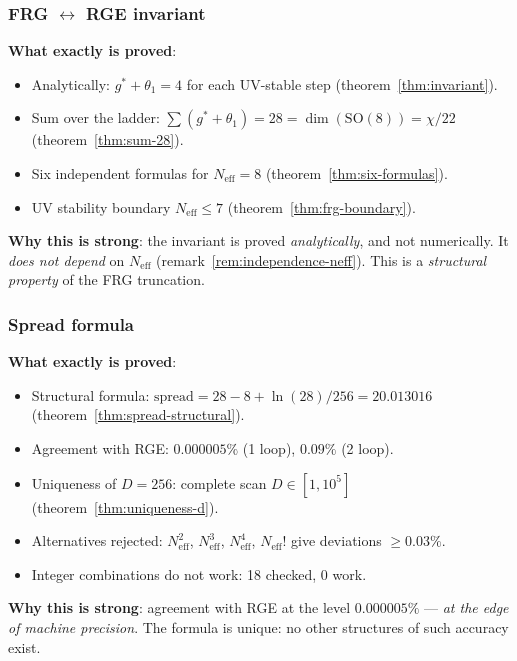 \documentclass[11pt,a4paper]{article}
\newcommand{\SO}{\ensuremath{\mathrm{SO}}}
\theoremstyle{definition}
\begin{document}
\subsubsection{FRG \texorpdfstring{$\leftrightarrow$}{} RGE invariant}

\textbf{What exactly is proved}:
\begin{itemize}
    \item Analytically: $g^* + \theta_1 = 4$ for each
          UV-stable step (theorem~\ref{thm:invariant}).
    \item Sum over the ladder:
          $\sum(g^* + \theta_1) = 28 = \dim(\SO(8)) = \chi/22$
          (theorem~\ref{thm:sum-28}).
    \item Six independent formulas for $N_{\text{eff}} = 8$
          (theorem~\ref{thm:six-formulas}).
    \item UV stability boundary $N_{\text{eff}} \le 7$
          (theorem~\ref{thm:frg-boundary}).
\end{itemize}

\medskip\noindent
\textbf{Why this is strong}: the invariant is proved
\emph{analytically}, and not numerically. It \emph{does not depend}
on $N_{\text{eff}}$ (remark~\ref{rem:independence-neff}).
This is a \emph{structural property} of the FRG truncation.

\subsubsection{Spread formula}

\textbf{What exactly is proved}:
\begin{itemize}
    \item Structural formula:
          $\text{spread} = 28 - 8 + \ln(28)/256 = 20.013016$
          (theorem~\ref{thm:spread-structural}).
    \item Agreement with RGE: $0.000005\%$ (1 loop),
          $0.09\%$ (2 loop).
    \item Uniqueness of $D = 256$: complete scan
          $D \in [1, 10^5]$ (theorem~\ref{thm:uniqueness-d}).
    \item Alternatives rejected: $N_{\text{eff}}^2$,
          $N_{\text{eff}}^3$, $N_{\text{eff}}^4$,
          $N_{\text{eff}}!$ give deviations $\geq 0.03\%$.
    \item Integer combinations do not work:
          18 checked, 0 work.
\end{itemize}

\medskip\noindent
\textbf{Why this is strong}: agreement with RGE at the level
$0.000005\%$ --- \emph{at the edge of machine precision}.
The formula is unique: no other structures of such accuracy exist.
\end{document}
